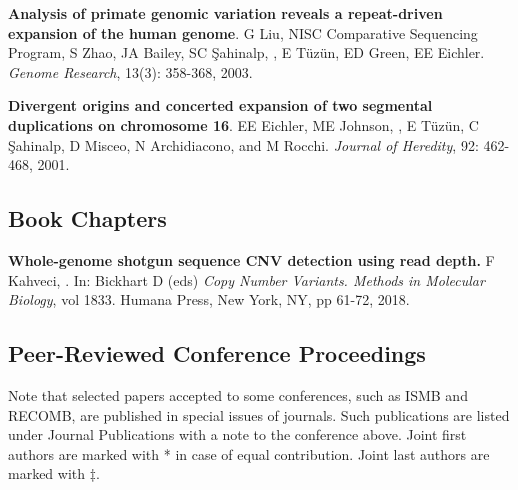 \vspace{-.2cm}
  {\bf Analysis of primate genomic variation reveals a repeat-driven 
    expansion of the human genome}.
  G Liu, NISC Comparative Sequencing Program, S Zhao, JA Bailey, 
  SC \c{S}ahinalp, \calkan{}, E T\"{u}z\"{u}n, ED Green, EE Eichler.
  {\em Genome Research}, 13(3): 358-368, 2003.

\vspace{-.2cm}
  {\bf Divergent origins and concerted expansion of two segmental
    duplications on 
    chromosome 16}.
  EE Eichler, ME Johnson, \calkan{}, E T\"{u}z\"{u}n, C \c{S}ahinalp,
    D Misceo, 
    N Archidiacono, and M Rocchi.
    {\em Journal of Heredity}, 92: 462-468, 2001.


\vspace{-.4cm}
\subsection{\small \sc  Book Chapters}
\vspace{-.4cm}


       {\bf Whole-genome shotgun sequence CNV detection using read depth.}
       F Kahveci, \calkan{}.
       In: Bickhart D (eds) {\em Copy Number Variants. Methods in Molecular Biology}, vol 1833. Humana Press, New York, NY, pp 61-72, 2018.


\clearpage

\vspace{-.4cm}
\subsection{\small \sc  Peer-Reviewed Conference Proceedings}
\vspace{-.4cm}
       {\small
Note that selected papers accepted to some conferences, such as ISMB and RECOMB, are published
in special issues of journals. Such publications are listed under Journal Publications with a note to the conference above.
Joint first authors are marked with * in case of equal contribution.
Joint last authors are marked with $\ddag$.
}




